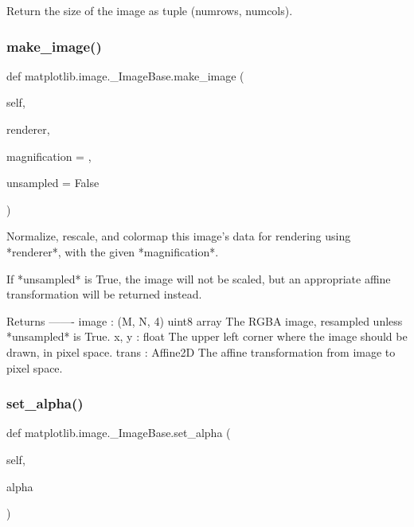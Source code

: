 \begin{DoxyVerb}Return the size of the image as tuple (numrows, numcols).\end{DoxyVerb}
 \mbox{\label{classmatplotlib_1_1image_1_1__ImageBase_a151f8eb95487c68ca5d410c6cf1187c2}} 
\subsubsection{\texorpdfstring{make\+\_\+image()}{make\_image()}}
{\footnotesize\ttfamily def matplotlib.\+image.\+\_\+\+Image\+Base.\+make\+\_\+image (\begin{DoxyParamCaption}\item[{}]{self,  }\item[{}]{renderer,  }\item[{}]{magnification = {},  }\item[{}]{unsampled = {\ttfamily False} }\end{DoxyParamCaption})}

\begin{DoxyVerb}Normalize, rescale, and colormap this image's data for rendering using
*renderer*, with the given *magnification*.

If *unsampled* is True, the image will not be scaled, but an
appropriate affine transformation will be returned instead.

Returns
-------
image : (M, N, 4) uint8 array
    The RGBA image, resampled unless *unsampled* is True.
x, y : float
    The upper left corner where the image should be drawn, in pixel
    space.
trans : Affine2D
    The affine transformation from image to pixel space.
\end{DoxyVerb}
 \mbox{\label{classmatplotlib_1_1image_1_1__ImageBase_a280c36871506b1dbbb02473195e7c036}} 
\subsubsection{\texorpdfstring{set\+\_\+alpha()}{set\_alpha()}}
{\footnotesize\ttfamily def matplotlib.\+image.\+\_\+\+Image\+Base.\+set\+\_\+alpha (\begin{DoxyParamCaption}\item[{}]{self,  }\item[{}]{alpha }\end{DoxyParamCaption})}

